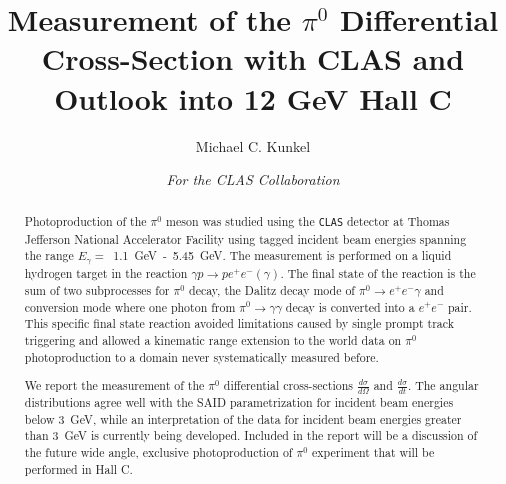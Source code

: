 \documentclass{aip-cp}
\begin{document}
\title{Measurement of the $\pi^0$ Differential Cross-Section with CLAS and Outlook into 12 GeV Hall C}

\author[aff1]{Michael C. Kunkel}
\author{\textit{For the CLAS Collaboration}}
\maketitle

\begin{abstract}
Photoproduction of the $\pi^0$ meson was studied using the \textsc{\texttt{CLAS}} detector at Thomas Jefferson National Accelerator Facility using tagged incident beam energies spanning the range $E_{\gamma}=$~1.1~GeV~-~5.45~GeV. The measurement is performed on a liquid hydrogen target in the reaction $\gamma p\to pe^+e^-(\gamma)$. The final state of the reaction is the sum of two subprocesses for $\pi^0$ decay, the Dalitz decay mode of $\pi^0\to e^+e^-\gamma$ and conversion mode where one photon from $\pi^0\to \gamma\gamma$ decay is converted into a $e^+e^-$ pair. This specific final state reaction avoided limitations caused by single prompt track triggering and allowed a kinematic range extension to the world data on $\pi^0$ photoproduction to a domain never systematically measured before.

We report the measurement of the $\pi^0$ differential cross-sections $\frac{d\sigma}{d\Omega}$ and $\frac{d\sigma}{dt}$. The angular distributions agree well with the SAID parametrization for incident beam energies below 3~GeV, while an interpretation of the data for incident beam energies greater than 3~GeV is currently being developed. Included in the report will be a discussion of the future wide angle, exclusive photoproduction of $\pi^0$ experiment that will be performed in Hall C.
\end{abstract}

\end{document}
